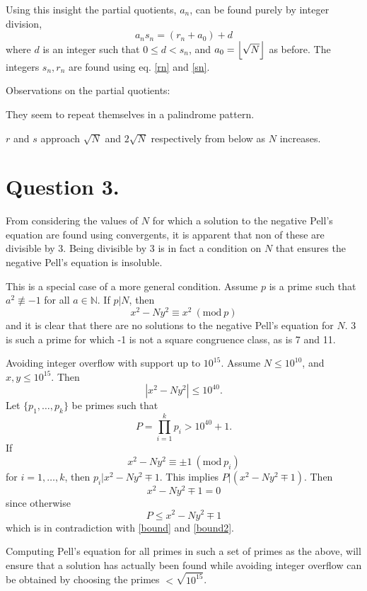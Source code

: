 \documentclass{article}
\newcommand{\N}{\mathbb N}
\DeclarePairedDelimiter\floor{\lfloor}{\rfloor}
\begin{document}
Using this insight the partial quotients, $a_n$, can be found purely by integer division, 
$$a_{n} s_n = (r_n + a_0) + d$$
where $d$ is an integer such that $0\le d < s_n$, and $a_0=\floor*{\sqrt N}$ as before. The integers $s_n, r_n$ are found using eq. \eqref{rn} and \eqref{sn}.

Observations on the partial quotients:

They seem to repeat themselves in a palindrome pattern.

$r$ and $s$ approach $\sqrt N$ and $2\sqrt N$ respectively from below as $N$ increases.

\section*{Question 3.}

From considering the values of $N$ for which a solution to the negative Pell's equation are found using convergents, it is apparent that non of these are divisible by 3. Being divisible by 3 is in fact a condition on $N$ that ensures the negative Pell's equation is insoluble. 

This is a special case of a more general condition. 
Assume $p$ is a prime such that $a^2 \not\equiv -1$ for all $a\in \N$.
If $p|N$, then
$$x^2-Ny^2 \equiv x^2\ (\textrm{mod}\ p)$$
and it is clear that there are no solutions to the negative Pell's equation for $N$. 
 3 is such a prime for which -1 is not a square congruence class, as is 7 and 11.
 
 Avoiding integer overflow with support up to $10^{15}$. 
Assume $N\le 10^{10}$, and $x,y \le 10^{15}$. Then
\begin{equation}
\label{bound}
|x^2-Ny^2|\le 10^{40}.
\end{equation}
Let $\{p_1, \ldots, p_k\}$ be primes such that 
\begin{equation}
\label{bound2}
P = \prod_{i=1}^k p_i > 10^{40}+1.
\end{equation}
If
$$x^2-Ny^2 \equiv \pm 1 \ (\textrm{mod}\ p_i)$$
for $i=1,\ldots,k$, then 
$p_i | x^2-Ny^2 \mp 1$.
This implies $P|(x^2-Ny^2 \mp 1)$. Then
$$x^2-Ny^2 \mp 1 = 0$$
since otherwise 
$$P \le x^2-Ny^2 \mp 1$$ which is in contradiction with \eqref{bound} and \eqref{bound2}.

Computing Pell's equation for all primes in such a set of primes as the above, will ensure that a solution has actually been found while avoiding integer overflow can be obtained by choosing the primes $<\sqrt{10^{15}}$.
 
\end{document}
